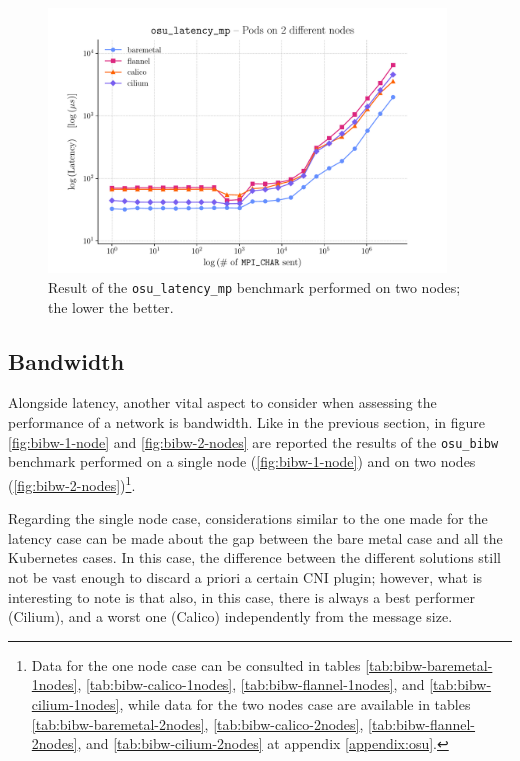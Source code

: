 \begin{figure}
  \centering
  \includegraphics[width=0.94\textwidth]{img/chpt3/latency_mp-2-nodes}
  \caption{Result of the \texttt{osu\_latency\_mp} benchmark performed on two
    nodes; the lower the better.}
  \label{fig:latency-mp-2-nodes}
\end{figure}

\clearpage

\subsection{Bandwidth}\label{subsec:results-bandwidth}

Alongside latency, another vital aspect to consider when assessing the
performance of a network is bandwidth.
Like in the previous section, in figure \ref{fig:bibw-1-node} and
\ref{fig:bibw-2-nodes} are reported the results of the \texttt{osu\_bibw}
benchmark performed on a single node (\ref{fig:bibw-1-node}) and on two nodes
(\ref{fig:bibw-2-nodes})\footnote{
  Data for the one node case can be consulted in
  tables \ref{tab:bibw-baremetal-1nodes}, \ref{tab:bibw-calico-1nodes},
  \ref{tab:bibw-flannel-1nodes}, and \ref{tab:bibw-cilium-1nodes}, while data
  for the two nodes case are available in tables
  \ref{tab:bibw-baremetal-2nodes}, \ref{tab:bibw-calico-2nodes},
  \ref{tab:bibw-flannel-2nodes}, and \ref{tab:bibw-cilium-2nodes} at appendix
  \ref{appendix:osu}.
}.

Regarding the single node case, considerations similar to the one made for the
latency case can be made about the gap between the bare metal case and all the
Kubernetes cases.
In this case, the difference between the different solutions still not be vast
enough to discard a priori a certain CNI plugin; however, what is interesting to
note is that also, in this case, there is always a best performer (Cilium), and
a worst one (Calico) independently from the message size.


